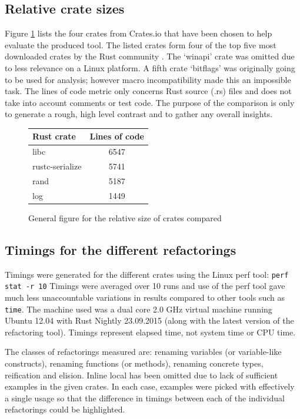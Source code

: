 \subsection{Relative crate sizes}
Figure \ref{Fig:codesize} lists the four crates from Crates.io that have been chosen to help evaluate the produced tool. The listed crates form four of the top five most downloaded crates by the Rust community \cite{cratesio15}. The `winapi' crate was omitted due to less relevance on a Linux platform. A fifth crate `bitflags' was originally going to be used for analysis; however macro incompatibility made this an impossible task. The lines of code metric only concerns Rust source (.rs) files and does not take into account comments or test code. The purpose of the comparison is only to generate a rough, high level contrast and to gather any overall insights. 

\begin{figure}[H]
\begin{center}
    \begin{tabular}{ | l | c |}
    \hline
    \textbf{Rust crate} & \textbf{Lines of code} \\ \hline
    libc & 6547 \\ \hline
    rustc-serialize &  5741 \\ \hline
    rand &   5187 \\ \hline
    log &  1449 \\ \hline
    \end{tabular}
\end{center}

\caption{General figure for the relative size of crates compared}
\label{Fig:codesize}
\end{figure}

\subsection{Timings for the different refactorings}
Timings were generated for the different crates using the Linux perf tool: {\verb|perf stat -r 10|} Timings were averaged over 10 runs and use of the perf tool gave much less unaccountable variations in results compared to other tools such as {\verb|time|}. The machine used was a dual core 2.0 GHz virtual machine running Ubuntu 12.04 with Rust Nightly 23.09.2015 (along with the latest version of the refactoring tool). Timings represent elapsed time, not system time or CPU time.

The classes of refactorings measured are: renaming variables (or variable-like constructs), renaming functions (or methods), renaming concrete types, reification and elision. Inline local has been omitted due to lack of sufficient examples in the given crates. In each case, examples were picked with effectively a single usage so that the difference in timings between each of the individual refactorings could be highlighted. 

